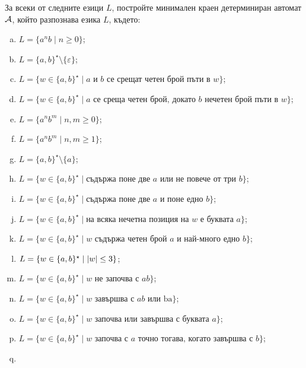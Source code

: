\begin{problem}
  За всеки от следните езици $L$, постройте минимален краен детерминиран автомат $\mathcal{A}$, който разпознава езика $L$, където:
  \begin{enumerate}[a)]
  \item 
    $L = \{a^nb\mid n \geq 0\}$;
  \item
    $L = \{a,b\}^\star\setminus\{\varepsilon\}$;
  \item
    $L = \{w \in \{a,b\}^\star \mid a \text{ и } b \text{ се срещат четен брой пъти в }w\}$;
  \item
    $L = \{w \in \{a,b\}^\star \mid a \text{ се среща четен брой, докато $b$ нечетен брой пъти в }w\}$;
  \item
    $L = \{a^nb^m\mid n,m \geq 0\}$;
  \item
    $L = \{a^nb^m\mid n,m \geq 1\}$;
  \item
    $L = \{a,b\}^\star \setminus \{a\}$;
  \item
    $L = \{w \in \{a,b\}^\star \mid \mbox{съдържа поне две }a\mbox{ или не повече от три }b\}$;
  \item
    $L = \{w \in \{a,b\}^\star \mid \mbox{съдържа поне две }a\mbox{ и поне едно }b\}$;
  \item
    $L = \{w \in \{a,b\}^\star \mid \mbox{на всяка нечетна позиция на }w\mbox{ е буквата }a\}$;
  \item
    $L = \{w \in \{a,b\}^\star \mid w\mbox{ съдържа четен брой }a\mbox{ и най-много едно }b\}$;
  \item
    $L = \{w \in \{a,b\}^\star\mid \vert{w}\vert \leq 3\}$;
  \item
    $L = \{w \in \{a,b\}^\star \mid w \mbox{ не започва с }ab\}$;
  \item
    $L = \{w \in \{a,b\}^\star \mid w \mbox{ завършва с }ab\mbox{ или ba}\}$;
  \item
    $L = \{w \in \{a,b\}^\star \mid w\mbox{ започва или завършва с буквата } a\}$;
  \item
    $L = \{w \in \{a,b\}^\star \mid w\mbox{ започва с $a$ точно тогава, когато завършва с $b$}\}$;
  \item

\end{enumerate}
\end{problem}
